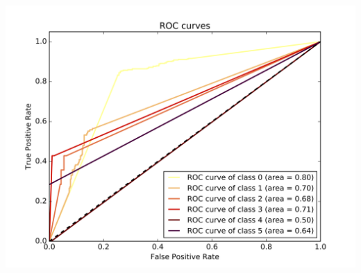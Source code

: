 \documentclass[c]{beamer}
\begin{document}
\begin{frame}
\begin{columns}
\begin{column}{0.6\textwidth}
      \centering\vfill
      \includegraphics[scale=0.18]{../../data/Belgique/test/Nearest_Neighboors_Classification/Nearest_Neighboors_Classification_roc.png}
\end{column}
\end{columns}
\end{frame}
\end{document}
